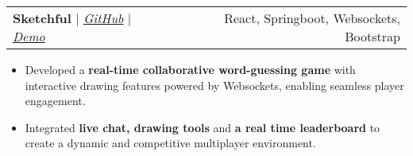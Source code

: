 \documentclass[letterpaper,11pt]{article}
\makeatletter
\newcommand{\resumeItem}[1]{
  \item\small{
    {#1 \vspace{-2pt}}
  }
}
\newcommand{\resumeProjectHeading}[2]{
    \vspace{-2pt}\item
    \begin{tabular*}{0.97\textwidth}{l@{\extracolsep{\fill}}r}
      \small#1 & #2 \\
    \end{tabular*}\vspace{-7pt}
}
\newcommand{\resumeItemListStart}{\begin{itemize}}
\newcommand{\resumeItemListEnd}{\end{itemize}\vspace{-5pt}}
\makeatother
\begin{document}
      \resumeProjectHeading
        {\textbf{Sketchful} $|$ \emph{\href{https://github.com/SKS59/Sketchful-main}{\color{blue}GitHub}}  $|$
        \emph{\href{https://youtu.be/rWNDrS7baQM}{\color{blue}Demo}}
        }{ React, Springboot, Websockets, Bootstrap}
          \resumeItemListStart
            \resumeItem{Developed a \textbf{real-time collaborative word-guessing game} with interactive drawing features powered by Websockets, enabling seamless player engagement.}
\resumeItem{Integrated \textbf{live chat, drawing tools} and \textbf{a real time leaderboard} to create a dynamic and competitive multiplayer environment.}

          \resumeItemListEnd
      
      
      
\end{document}
